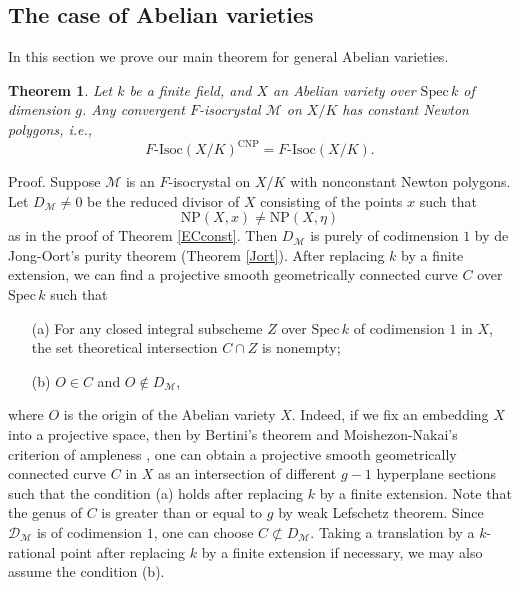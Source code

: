 \documentclass[11pt]{amsart}
\newtheorem{theorem}[Lemma]{Theorem}
\begin{document}
\subsection{The case of Abelian varieties}

In this section we prove our main theorem for general Abelian varieties. 

\begin{theorem}\label{abconst} Let $k$ be a finite field, and $X$ an Abelian variety over $\mathrm{Spec}\, k$ of dimension $g$. 
Any convergent $F$-isocrystal $\mathcal M$ on $X/K$ has constant Newton polygons, i.e., 
$$
  F\mbox{-}\mathrm{Isoc}(X/K)^{\mathrm{CNP}} = F\mbox{-}\mathrm{Isoc}(X/K). 
$$
\end{theorem}

\noindent
{\sc Proof.} Suppose $\mathcal M$ is an $F$-isocrystal on $X/K$ with 
nonconstant Newton polygons. 
Let $D_{\mathcal M} \ne 0$ be the reduced divisor of $X$ consisting of the points $x$ such that 
$$
     \mathrm{NP}(X, x) \ne \mathrm{NP}(X, \eta)
$$
as in the proof of Theorem \ref{ECconst}. Then 
$D_{\mathcal M}$ is purely of codimension $1$ by de Jong-Oort's purity theorem 
(Theorem \ref{Jort}). 
After replacing $k$ by a finite extension, 
we can find a projective smooth geometrically connected curve 
$C$ over $\mathrm{Spec}\, k$ such that 
\begin{enumerate}
\item[(a)] For any closed integral subscheme $Z$ over $\mathrm{Spec}\, k$ of codimension $1$ in $X$, 
the set theoretical intersection $C \cap Z$ is nonempty; 
\item[(b)] $O \in C$ and $O \not\in D_{\mathcal M}$, 
\end{enumerate}
where $O$ is the origin of the Abelian variety $X$. 
Indeed, if we fix an embedding $X$ into a projective space, then 
by Bertini's theorem and Moishezon-Nakai's criterion of ampleness \cite[Appendix A, Theorem 5.1]{Ha},   
one can obtain a projective smooth geometrically connected curve $C$ in $X$ 
as an intersection of different $g-1$ hyperplane sections  
such that the condition (a) holds 
after replacing $k$ by a finite extension. 
Note that the genus of $C$ is greater than or equal to $g$ by weak Lefschetz theorem. 
Since $\mathcal D_{\mathcal M}$ is of codimension $1$, one can choose $C \not\subset D_{\mathcal M}$. 
Taking a translation by a $k$-rational point after replacing $k$ by a finite extension if necessary, 
we may also assume the condition (b). 
\end{document}
